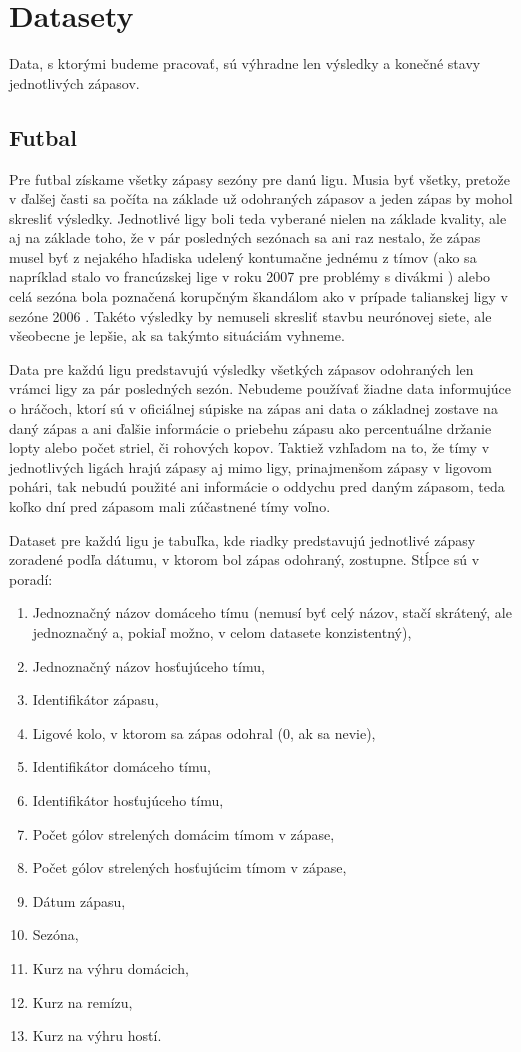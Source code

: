 \chapter{Datasety}

Data, s ktorými budeme pracovať, sú výhradne len výsledky a konečné stavy jednotlivých zápasov. 

\section{Futbal} \label{foot}
Pre futbal získame všetky zápasy sezóny pre danú ligu. 
Musia byť všetky, pretože v ďalšej časti sa počíta na základe už odohraných zápasov a jeden zápas by mohol skresliť výsledky. 
Jednotlivé ligy boli teda vyberané nielen na základe kvality, ale aj na základe toho, že v pár posledných sezónach sa ani raz nestalo, že zápas musel byť z nejakého hľadiska udelený kontumačne jednému z tímov (ako sa napríklad stalo vo francúzskej lige v roku 2007 pre problémy s divákmi \citep{awarded}) alebo celá sezóna bola poznačená korupčným škandálom ako v prípade talianskej ligy v sezóne 2006 \citep{scandal}.
Takéto výsledky by nemuseli skresliť stavbu neurónovej siete, ale všeobecne je lepšie, ak sa takýmto situáciám vyhneme.

Data pre každú ligu predstavujú výsledky všetkých zápasov odohraných len vrámci ligy za pár posledných sezón. 
Nebudeme používať žiadne data informujúce o hráčoch, ktorí sú v oficiálnej súpiske na zápas ani data o základnej zostave na daný zápas a ani ďalšie informácie o priebehu zápasu ako percentuálne držanie lopty alebo počet striel, či rohových kopov.
Taktiež vzhľadom na to, že tímy v jednotlivých ligách hrajú zápasy aj mimo ligy, prinajmenšom zápasy v ligovom pohári, tak nebudú použité ani informácie o oddychu pred daným zápasom, teda koľko dní pred zápasom mali zúčastnené tímy voľno.

Dataset pre každú ligu je tabuľka, kde riadky predstavujú jednotlivé zápasy zoradené podľa dátumu, v ktorom bol zápas odohraný, zostupne.
Stĺpce sú v poradí:
\begin{enumerate}
  \item Jednoznačný názov domáceho tímu (nemusí byť celý názov, stačí skrátený, ale jednoznačný a, pokiaľ možno, v celom datasete konzistentný),
  \item Jednoznačný názov hosťujúceho tímu,
  \item Identifikátor zápasu,
  \item Ligové kolo, v ktorom sa zápas odohral (0, ak sa nevie),
  \item Identifikátor domáceho tímu,
  \item Identifikátor hosťujúceho tímu,
  \item Počet gólov strelených domácim tímom v zápase,
  \item Počet gólov strelených hosťujúcim tímom v zápase,
  \item Dátum zápasu,
  \item Sezóna,
  \item Kurz na výhru domácich,
  \item Kurz na remízu,
  \item Kurz na výhru hostí.
\end{enumerate}

